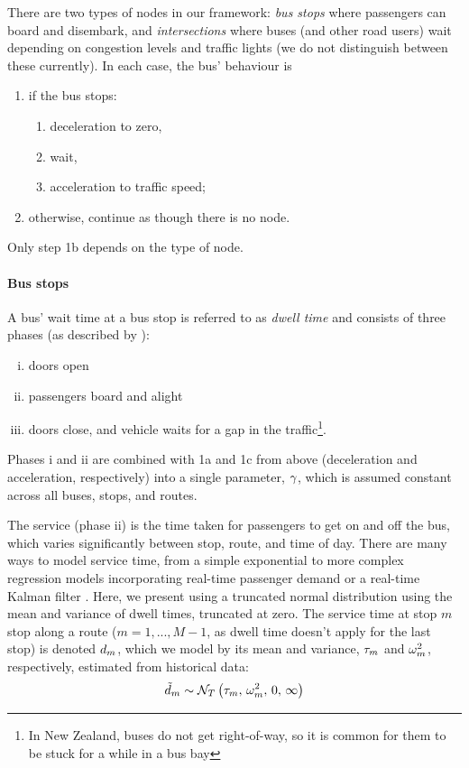 There are two types of nodes in our framework: \emph{bus stops} where passengers can board and disembark, and \emph{intersections} where buses (and other road users) wait depending on congestion levels and traffic lights (we do not distinguish between these currently). In each case, the bus' behaviour is
\begin{enumerate}
\item if the bus stops:
    \begin{enumerate}
    \item deceleration to zero,
    \item wait,
    \item acceleration to traffic speed;
    \end{enumerate}
\item otherwise, continue as though there is no node.
\end{enumerate}
Only step 1b depends on the type of node.



\paragraph{Bus stops}

A bus' wait time at a bus stop is referred to as \emph{dwell time} and consists of three phases (as described by \citet{Hans_2015}):
\begin{enumerate}[i.]
\item doors open
\item passengers board and alight
\item doors close, and vehicle waits for a gap in the traffic\footnote{In New Zealand, buses do not get right-of-way, so it is common for them to be stuck for a while in a bus bay}.
\end{enumerate}
Phases i and ii are combined with 1a and 1c from above (deceleration and acceleration, respectively) into a single parameter, $\gamma$, which is assumed constant across all buses, stops, and routes.


The service (phase ii) is the time taken for passengers to get on and off the bus, which varies significantly between stop, route, and time of day. There are many ways to model service time, from a simple exponential \citep{Hans_2015} to more complex regression models incorporating real-time passenger demand \citep{Shen_2013} or a real-time Kalman filter \citep{Shalaby_2004}. Here, we present using a truncated normal distribution using the mean and variance of dwell times, truncated at zero. The service time at stop $m$ stop along a route ($m=1,...,M-1$, as dwell time doesn't apply for the last stop) is denoted $d_m$, which we model by its mean and variance, $\tau_m$ and $\omega^2_m$, respectively, estimated from historical data:
\begin{equation}
\label{eq:stop_dwell_time}
\tilde d_m \sim \mathcal{N}_T\left(\tau_m,\, \omega^2_m,\, 0,\, \infty\right)
\end{equation}

